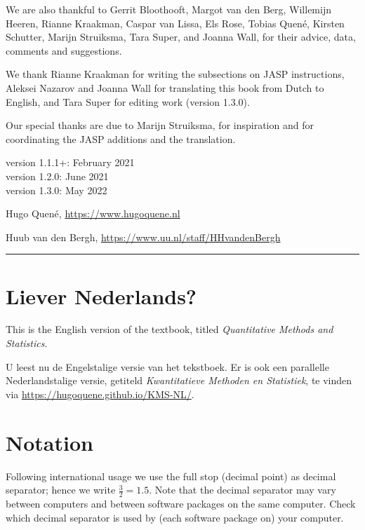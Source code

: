 \documentclass[
]{book}
\begin{document}
We are also thankful to
Gerrit Bloothooft,
Margot van den Berg,
Willemijn Heeren,
Rianne Kraakman,
Caspar van Lissa,
Els Rose,
Tobias Quené,
Kirsten Schutter,
Marijn Struiksma,
Tara Super,
and Joanna Wall,
for their advice, data, comments and suggestions.

We thank Rianne Kraakman for writing the subsections on JASP instructions, Aleksei Nazarov and Joanna Wall for translating this book from Dutch to English, and Tara Super for editing work (version 1.3.0).

Our special thanks are due to Marijn Struiksma, for inspiration and for coordinating the JASP additions and the translation.

version 1.1.1+: February 2021\\
version 1.2.0: June 2021\\
version 1.3.0: May 2022

Hugo Quené, \url{https://www.hugoquene.nl}

Huub van den Bergh, \url{https://www.uu.nl/staff/HHvandenBergh}

\begin{center}\rule{0.5\linewidth}{0.5pt}\end{center}

\section*{Liever Nederlands?}\label{liever-nederlands}

This is the English version of the textbook, titled \emph{Quantitative Methods and Statistics}.

U leest nu de Engelstalige versie van het tekstboek. Er is ook een parallelle Nederlandstalige versie, getiteld \emph{Kwantitatieve Methoden en Statistiek}, te vinden via \url{https://hugoquene.github.io/KMS-NL/}.

\section*{Notation}\label{notation}

Following international usage we use the full stop (decimal point) as decimal separator; hence we write \(\frac{3}{2}=1.5\). Note that the decimal separator may vary between computers and between software packages on the same computer. Check which decimal separator is used by (each software package on) your computer.
\end{document}
